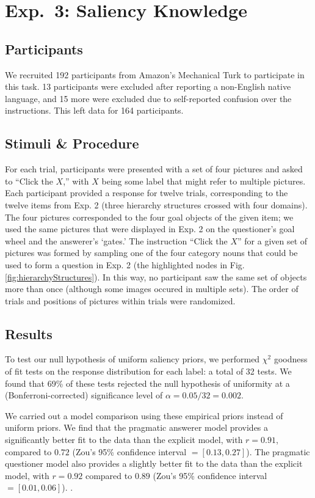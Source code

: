 \documentclass[12pt, floatsintext, jou]{apa6}
\begin{document}
\section{Exp.~3: Saliency Knowledge}

\subsection{Participants} 
We recruited 192 participants from Amazon's Mechanical Turk to participate in this task. 13 participants were excluded after reporting a non-English native language, and 15 more were excluded due to self-reported confusion over the instructions. This left data for 164 participants.

\subsection{Stimuli \& Procedure}
For each trial, participants were presented with a set of four pictures and asked to ``Click the $X$,'' with $X$ being some label that might refer to multiple pictures. Each participant provided a response for twelve trials, corresponding to the twelve items from Exp. 2 (three hierarchy structures crossed with four domains). The four pictures corresponded to the four goal objects of the given item; we used the same pictures that were displayed in Exp. 2 on the questioner's goal wheel and the answerer's `gates.' The instruction ``Click the $X$'' for a given set of pictures was formed by sampling one of the four category nouns that could be used to form a question in Exp. 2 (the highlighted nodes in Fig. \ref{fig:hierarchyStructures}). In this way, no participant saw the same set of objects more than once (although some images occured in multiple sets). The order of trials and positions of pictures within trials were randomized.

\subsection{Results}

To test our null hypothesis of uniform saliency priors, we performed $\chi^2$ goodness of fit tests on the response distribution for each label: a total of 32 tests. We found that 69\% of these tests rejected the null hypothesis of uniformity at a (Bonferroni-corrected) significance level of $\alpha = 0.05/32 = 0.002$. 

We carried out a model comparison using these empirical priors instead of uniform priors. We find that the pragmatic answerer model provides a significantly better fit to the data than the explicit model, with $r=0.91$, compared to $0.72$ (Zou's 95\% confidence interval $= [0.13, 0.27]$). The pragmatic questioner model also provides a slightly better fit to the data than the explicit model, with $r = 0.92$ compared to $0.89$ (Zou's 95\% confidence interval $= [0.01, 0.06]$). .
\end{document}
